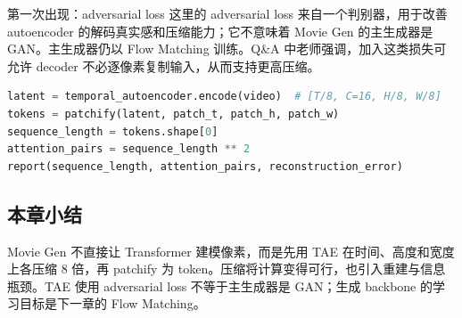\begin{knowledgebox}{第一次出现：adversarial loss}
这里的 adversarial loss 来自一个判别器，用于改善 autoencoder 的解码真实感和压缩能力；它不意味着 Movie Gen 的主生成器是 GAN。主生成器仍以 Flow Matching 训练。Q\&A 中老师强调，加入这类损失可允许 decoder 不必逐像素复制输入，从而支持更高压缩。
\end{knowledgebox}


\begin{lstlisting}[language=Python,caption={视频压缩与 token accounting 的最小核算}]
latent = temporal_autoencoder.encode(video)  # [T/8, C=16, H/8, W/8]
tokens = patchify(latent, patch_t, patch_h, patch_w)
sequence_length = tokens.shape[0]
attention_pairs = sequence_length ** 2
report(sequence_length, attention_pairs, reconstruction_error)
\end{lstlisting}

\subsection{本章小结}

Movie Gen 不直接让 Transformer 建模像素，而是先用 TAE 在时间、高度和宽度上各压缩 8 倍，再 patchify 为 token。压缩将计算变得可行，也引入重建与信息瓶颈。TAE 使用 adversarial loss 不等于主生成器是 GAN；生成 backbone 的学习目标是下一章的 Flow Matching。

